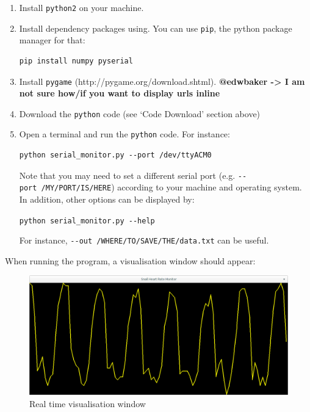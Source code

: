 \documentclass[]{article}
\begin{document}
\begin{enumerate}
\def\labelenumi{\arabic{enumi}.}
\item
  Install \texttt{python2} on your machine.
\item
  Install dependency packages using. You can use \texttt{pip}, the
  python package manager for that:

\begin{verbatim}
pip install numpy pyserial
\end{verbatim}
\item
  Install \texttt{pygame} (http://pygame.org/download.shtml).
  \textbf{@edwbaker -\textgreater{} I am not sure how/if you want to
  display urls inline}
\item
  Download the \texttt{python} code (see `Code Download' section above)
\item
  Open a terminal and run the \texttt{python} code. For instance:

\begin{verbatim}
python serial_monitor.py --port /dev/ttyACM0
\end{verbatim}

  Note that you may need to set a different serial port (e.g.
  \texttt{-\/-port\ /MY/PORT/IS/HERE}) according to your machine and
  operating system. In addition, other options can be displayed by:

  \texttt{python\ serial\_monitor.py\ -\/-help}

  For instance, \texttt{-\/-out\ /WHERE/TO/SAVE/THE/data.txt} can be
  useful.
\end{enumerate}

When running the program, a visualisation window should appear:

\begin{figure}[htbp]
\centering
\includegraphics{./img/python_window.png}
\caption{Real time visualisation window}
\end{figure}
\end{document}
